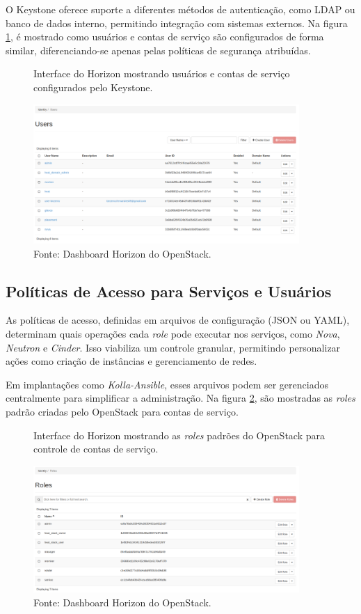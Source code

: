 O Keystone oferece suporte a diferentes métodos de autenticação, como LDAP ou banco de dados interno, permitindo integração com sistemas externos. Na figura \ref{fig:openstack_users}, é mostrado como usuários e contas de serviço são configurados de forma similar, diferenciando-se apenas pelas políticas de segurança atribuídas.

\begin{figure}[htbp]
    \centering
    \caption{Interface do Horizon mostrando usuários e contas de serviço configurados pelo Keystone.}
    \includegraphics[width=0.9\textwidth]{images/openstack_users.png}
    \caption*{Fonte: Dashboard Horizon do OpenStack.}
    \label{fig:openstack_users}
\end{figure}

\subsection{Políticas de Acesso para Serviços e Usuários}
As políticas de acesso, definidas em arquivos de configuração (JSON ou YAML), determinam quais operações cada \textit{role} pode executar nos serviços, como \textit{Nova}, \textit{Neutron} e \textit{Cinder}. Isso viabiliza um controle granular, permitindo personalizar ações como criação de instâncias e gerenciamento de redes.

Em implantações como \textit{Kolla-Ansible}, esses arquivos podem ser gerenciados centralmente para simplificar a administração. Na figura \ref{fig:openstack_roles}, são mostradas as \textit{roles} padrão criadas pelo OpenStack para contas de serviço.

\begin{figure}[htbp]
    \centering
    \caption{Interface do Horizon mostrando as \textit{roles} padrões do OpenStack para controle de contas de serviço.}
    \includegraphics[width=0.9\textwidth]{images/openstack_roles.png}
    \caption*{Fonte: Dashboard Horizon do OpenStack.}
    \label{fig:openstack_roles}
\end{figure}

